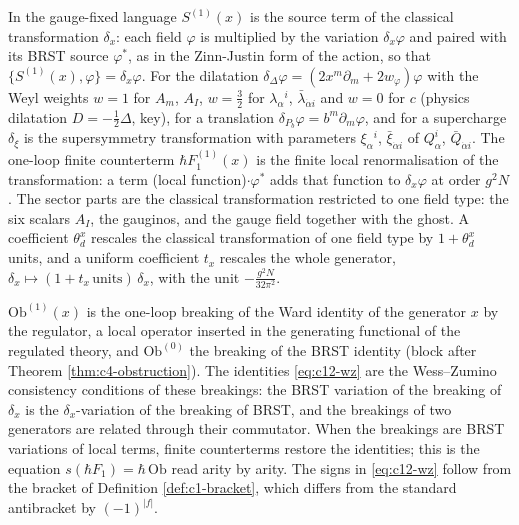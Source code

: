 \begin{remark}
In the gauge-fixed language $S^{(1)}(x)$ is the source term of the classical transformation $\delta_x$: each field $\varphi$ is multiplied by the variation $\delta_x\varphi$ and paired with its BRST source $\varphi^*$, as in the Zinn-Justin form of the action, so that $\{S^{(1)}(x),\varphi\}=\delta_x\varphi$. For the dilatation $\delta_\Delta\varphi=(2x^m\partial_m+2w_\varphi)\varphi$ with the Weyl weights $w=1$ for $A_m$, $A_I$, $w=\tfrac32$ for $\lambda_\alpha{}^i$, $\bar\lambda_{\dot\alpha i}$ and $w=0$ for $c$ (physics dilatation $D=-\tfrac12\Delta$, key), for a translation $\delta_{P_b}\varphi=b^m\partial_m\varphi$, and for a supercharge $\delta_\xi$ is the supersymmetry transformation with parameters $\xi_\alpha{}^i$, $\bar\xi_{\dot\alpha i}$ of $Q^i_\alpha$, $\bar Q_{\dot\alpha i}$. The one-loop finite counterterm $\hbar F_1^{(1)}(x)$ is the finite local renormalisation of the transformation: a term (local function)$\cdot\varphi^*$ adds that function to $\delta_x\varphi$ at order $g^2N$. The sector parts are the classical transformation restricted to one field type: the six scalars $A_I$, the gauginos, and the gauge field together with the ghost. A coefficient $\theta^x_d$ rescales the classical transformation of one field type by $1+\theta^x_d$ units, and a uniform coefficient $t_x$ rescales the whole generator, $\delta_x\mapsto(1+t_x\,\text{units})\,\delta_x$, with the unit $-\tfrac{g^2N}{32\pi^2}$.
\end{remark}

\begin{remark}
$\mathrm{Ob}^{(1)}(x)$ is the one-loop breaking of the Ward identity of the generator $x$ by the regulator, a local operator inserted in the generating functional of the regulated theory, and $\mathrm{Ob}^{(0)}$ the breaking of the BRST identity (block after Theorem \ref{thm:c4-obstruction}). The identities \eqref{eq:c12-wz} are the Wess--Zumino consistency conditions of these breakings: the BRST variation of the breaking of $\delta_x$ is the $\delta_x$-variation of the breaking of BRST, and the breakings of two generators are related through their commutator. When the breakings are BRST variations of local terms, finite counterterms restore the identities; this is the equation $s(\hbar F_1)=\hbar\,\mathrm{Ob}$ read arity by arity. The signs in \eqref{eq:c12-wz} follow from the bracket of Definition \ref{def:c1-bracket}, which differs from the standard antibracket by $(-1)^{|f|}$.
\end{remark}

